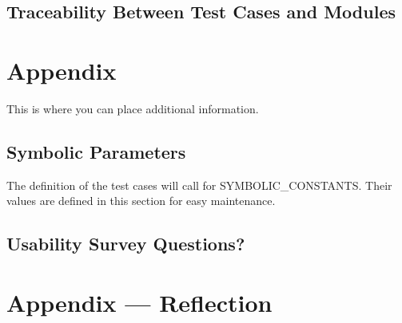 \documentclass[12pt, titlepage]{article}
\begin{document}
\subsection{Traceability Between Test Cases and Modules}

				




\newpage

\section{Appendix}

This is where you can place additional information.

\subsection{Symbolic Parameters}

The definition of the test cases will call for SYMBOLIC\_CONSTANTS.
Their values are defined in this section for easy maintenance.

\subsection{Usability Survey Questions?}


\newpage{}
\section*{Appendix --- Reflection}



% 
\end{document}
